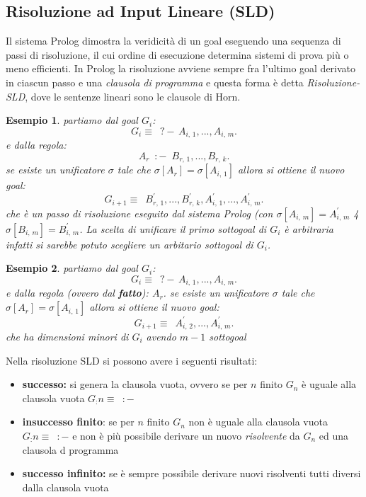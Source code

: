 \documentclass[a4paper]{report}
\newtheorem{esempio}{Esempio}
\begin{document}
\subsection{Risoluzione ad Input Lineare (SLD)}
Il sistema Prolog dimostra la veridicità di un goal eseguendo una sequenza di passi di risoluzione, il cui ordine di esecuzione
determina sistemi di prova più o meno efficienti.\newline
In Prolog la risoluzione avviene sempre fra l’ultimo goal derivato in ciascun passo e una \emph{clausola di programma}
e questa forma è detta \emph{Risoluzione-SLD}, dove le sentenze lineari sono le clausole di Horn.
\begin{esempio}
  partiamo dal goal $G_i$:
\begin{equation*}
  G_i\equiv \,\,\,?-\, A_{i,\, 1}, ...,  A_{i,\, m}.
\end{equation*}
e dalla regola:
\begin{equation*}
  A_r\,\,\,:-\,\,\, B_{r,\,1},..., B_{r,\,k}.
\end{equation*}
se esiste un unificatore $\sigma$ tale che $\sigma[A_r]=\sigma[A_{i,\,1}]$ allora si ottiene il nuovo goal:
\begin{equation*}
  G_{i+1}\equiv\,\,\,B^{'}_{r,\,1},..., B^{'}_{r,\,k},A^{'}_{i,\, 1}, ...,  A^{'}_{i,\, m}.
\end{equation*}
che è un passo di risoluzione eseguito dal sistema Prolog (con $\sigma[A_{i,\,m}]=A^{'}_{i,\,m}$ 4 $\sigma[B_{i,\,m}]=B^{'}_{i,\,m}$.
La scelta di unificare il primo sottogoal di $G_i$ è arbitraria infatti si sarebbe potuto scegliere un arbitario sottogoal di $G_i$.
\end{esempio}
\begin{esempio}
partiamo dal goal $G_i$:
\begin{equation*}
  G_i\equiv \,\,\,?-\, A_{i,\, 1}, ...,  A_{i,\, m}.
\end{equation*}
e dalla regola (ovvero dal \textbf{fatto}): $A_r$.
se esiste un unificatore $\sigma$ tale che $\sigma[A_r]=\sigma[A_{i,\,1}]$ allora si ottiene il nuovo goal:
\begin{equation*}
  G_{i+1}\equiv\,\,\,A^{'}_{i,\, 2}, ...,  A^{'}_{i,\, m}.
\end{equation*}
che ha dimensioni minori di $G_i$ avendo $m-1$ sottogoal
\end{esempio}
Nella risoluzione SLD si possono avere i seguenti risultati:
\begin{itemize}
\item \textbf{successo:} si genera la clausola vuota, ovvero se per $n$ finito $G_n$ è uguale alla clausola vuota $G_:n\equiv\,\,\,:-$
\item \textbf{insuccesso finito}: se per $n$ finito $G_n$  non è uguale alla clausola vuota $G_:n\equiv\,\,\,:-$ e non è più possibile derivare un nuovo \textit{risolvente} da $G_n$ ed una clausola d programma
\item \textbf{successo infinito: }se è sempre possibile derivare nuovi risolventi tutti diversi dalla clausola vuota
\end{itemize}
\end{document}

